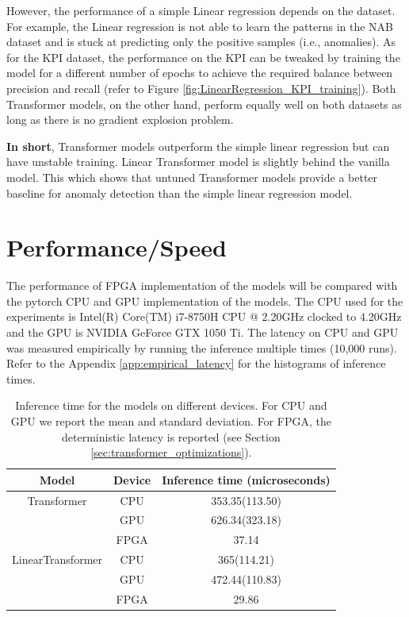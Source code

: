 \documentclass[a4paper, twoside]{report}
\theoremstyle{definition}
\numberwithin{equation}{section}
\begin{document}
However, the performance of a simple Linear regression depends on the dataset. For example,
the Linear regression is not able to learn the patterns in the NAB dataset
and is stuck at predicting only the positive samples (i.e., anomalies).
As for the KPI dataset, the performance on the KPI can be tweaked by training
the model for a different number of epochs to achieve the required balance between
precision and recall (refer to Figure \ref{fig:LinearRegression_KPI_training}).
Both Transformer models, on the other hand, perform equally well on both datasets
as long as there is no gradient explosion problem.

\textbf{In short}, Transformer models outperform the simple linear regression
but can have unstable training. Linear Transformer model is slightly behind
the vanilla model. This which shows that untuned Transformer models
provide a better baseline for anomaly detection than the simple linear regression model.


\section{Performance/Speed} \label{sec:performance}

The performance of FPGA implementation of the models will be compared with the
pytorch CPU and GPU implementation of the models.
The CPU used for the experiments is Intel(R) Core(TM) i7-8750H CPU @ 2.20GHz clocked
to 4.20GHz and the GPU is NVIDIA GeForce GTX 1050 Ti.
The latency on CPU and GPU was measured empirically by running the inference
multiple times (10,000 runs).
Refer to the Appendix \ref{app:empirical_latency} for the histograms of
inference times.

\begin{table}[h]
    \centering
    \begin{tabular}{|c|c|c|}
        \hline
        Model             & Device & Inference time (microseconds) \\
        \hline
        Transformer       & CPU    & 353.35(113.50)                \\
                          & GPU    & 626.34(323.18)                \\
                          & FPGA   & 37.14                         \\
        \hline
        LinearTransformer & CPU    & 365(114.21)                   \\
                          & GPU    & 472.44(110.83)                \\
                          & FPGA   & 29.86                         \\
        \hline
    \end{tabular}
    \caption{Inference time for the models on different devices.
        For CPU and GPU we report the mean and standard deviation.
        For FPGA, the deterministic latency is reported (see Section \ref{sec:transformer_optimizations}).
    }
    \label{tab:inference_time}
\end{table}
\end{document}
